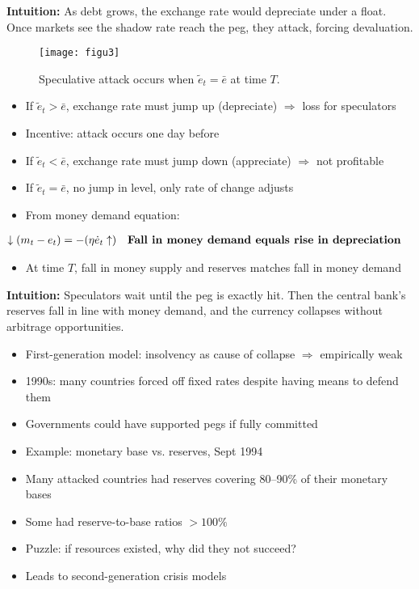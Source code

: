 \documentclass[12pt]{article}
\begin{document}
\textbf{Intuition:} As debt grows, the exchange rate would depreciate under a float. Once markets see the shadow rate reach the peg, they attack, forcing devaluation.

\begin{figure}[H]
    \centering
    \texttt{[image: figu3]}
    \caption{Speculative attack occurs when $\tilde{e}_t = \bar{e}$ at time $T$.}
\end{figure}

\begin{itemize}
    \item If $\tilde{e}_t > \bar{e}$, exchange rate must jump up (depreciate) $\Rightarrow$ loss for speculators
    \item Incentive: attack occurs one day before
    \item If $\tilde{e}_t < \bar{e}$, exchange rate must jump down (appreciate) $\Rightarrow$ not profitable
    \item If $\tilde{e}_t = \bar{e}$, no jump in level, only rate of change adjusts
    \item From money demand equation:
\end{itemize}

\singlespacing
\begin{align}
\downarrow (m_t - e_t) &= -(\eta \dot{e}_t \uparrow) && \text{\textbf{Fall in money demand equals rise in depreciation}}
\end{align}

\begin{itemize}
    \item At time $T$, fall in money supply and reserves matches fall in money demand
\end{itemize}

\textbf{Intuition:} Speculators wait until the peg is exactly hit. Then the central bank’s reserves fall in line with money demand, and the currency collapses without arbitrage opportunities.

\begin{itemize}
    \item First-generation model: insolvency as cause of collapse $\Rightarrow$ empirically weak
    \item 1990s: many countries forced off fixed rates despite having means to defend them
    \item Governments could have supported pegs if fully committed
    \item Example: monetary base vs. reserves, Sept 1994
    \item Many attacked countries had reserves covering 80--90\% of their monetary bases
    \item Some had reserve-to-base ratios $> 100\%$
    \item Puzzle: if resources existed, why did they not succeed?
    \item Leads to second-generation crisis models
\end{itemize}
\end{document}
